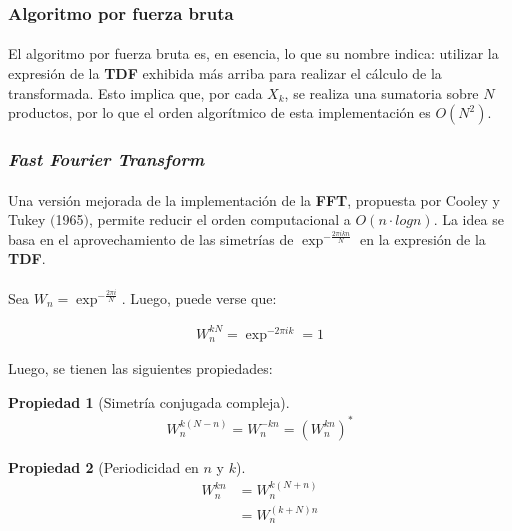 \documentclass[12pt, twocolumn]{article}
\newtheorem{theorem}{Propiedad}
\begin{document}
	\subsubsection{Algoritmo por fuerza bruta}
	
	\paragraph{} El algoritmo por fuerza bruta es, en esencia, lo que su nombre indica: utilizar la expresión de la \textbf{TDF} exhibida más arriba para realizar el cálculo de la transformada. Esto implica que, por cada $X_{k}$, se realiza una sumatoria sobre $N$ productos, por lo que el orden algorítmico de esta implementación es $O(N^{2})$.
	
	\subsubsection{\textit{Fast Fourier Transform}}
	
	\paragraph{} Una versión mejorada de la implementación de la \textbf{FFT}, propuesta por Cooley y Tukey $($1965$)$, permite reducir el orden computacional a $O(n\cdot log n)$. La idea se basa en el aprovechamiento de las simetrías de $\exp^{-\frac{2\pi i k n}{N}}$ en la expresión de la \textbf{TDF}.
	
	\paragraph{} Sea $W_{n} = \exp^{-\frac{2\pi i}{N}}$. Luego, puede verse que:
	
	\begin{align}
		W_{n}^{kN} = \exp^{-2\pi i k} = 1
	\end{align}
	
	Luego, se tienen las siguientes propiedades:
	
	\begin{theorem}[Simetría conjugada compleja]
		\begin{align*}
			W_{n}^{k(N-n)} = W_{n}^{-kn} = (W_{n}^{kn})^{*}
		\end{align*}
	\end{theorem}
	
	\begin{theorem}[Periodicidad en $n$ y $k$]
		\begin{align*}
			W_{n}^{kn} &= W_{n}^{k(N+n)} \\
			&= W_{n}^{(k+N)n}
		\end{align*}
	\end{theorem}
	
\end{document}
